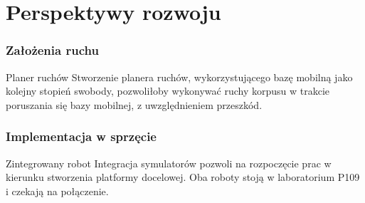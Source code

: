 \section{Perspektywy rozwoju}


\begin{frame}
    \frametitle{Założenia ruchu}
    \begin{block}{Planer ruchów}
    Stworzenie planera ruchów, wykorzystującego bazę mobilną jako kolejny stopień swobody,
    pozwoliłoby wykonywać ruchy korpusu w trakcie poruszania się bazy mobilnej, z uwzględnieniem 
    przeszkód.
    \end{block}
\end{frame}


\begin{frame}
    \frametitle{Implementacja w sprzęcie}
    \begin{block}{Zintegrowany robot}
    Integracja symulatorów pozwoli na rozpoczęcie prac w kierunku stworzenia platformy docelowej.
    Oba roboty stoją w laboratorium P109 i czekają na połączenie.
    \end{block}
\end{frame}